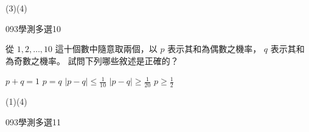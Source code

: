 \begin{QUESTIONS}
\begin{QUESTION}
\begin{QBODY}
        \end{QBODY}
        \begin{QFROMS}
        \end{QFROMS}
        \begin{QTAGS}\end{QTAGS}
        \begin{QANS}
            (3)(4)
        \end{QANS}
        \begin{QSOLLIST}
        \end{QSOLLIST}
        \begin{QEMPTYSPACE}
        \end{QEMPTYSPACE}
    \end{QUESTION}
    \begin{QUESTION}
        \begin{ExamInfo}{093}{學測}{多選}{10}
        \end{ExamInfo}
        \begin{ExamAnsRateInfo}{43}{77}{40}{12}
        \end{ExamAnsRateInfo}
        \begin{QBODY}
            從 $1,2,\dots ,10$ 這十個數中隨意取兩個，以 $p$ 表示其和為偶數之機率， $q$ 表示其和為奇數之機率。 試問下列哪些敘述是正確的？
             \begin{QOPS} 
                \QOP $p+q=1$ 
                \QOP $p=q$  
                \QOP $|p-q| \leq \frac{1}{10} $ 
                \QOP $|p-q| \geq \frac{1}{20}$ \QOP $p\geq \frac{1}{2}$
            \end{QOPS}
        \end{QBODY}
        \begin{QFROMS}
        \end{QFROMS}
        \begin{QTAGS}\end{QTAGS}
        \begin{QANS}
            (1)(4)
        \end{QANS}
        \begin{QSOLLIST}
        \end{QSOLLIST}
        \begin{QEMPTYSPACE}
        \end{QEMPTYSPACE}
    \end{QUESTION}
    \begin{QUESTION}
        \begin{ExamInfo}{093}{學測}{多選}{11}
        \end{ExamInfo}

\end{QUESTION}
\end{QUESTIONS}
